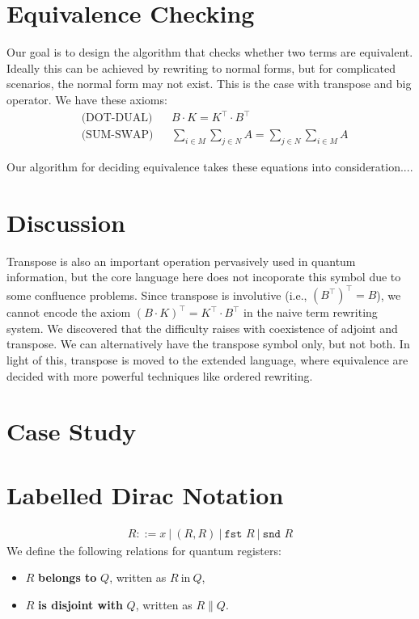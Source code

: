 \documentclass[manuscript, review, timestamp]{acmart}
\newcommand*{\fst}{\texttt{fst }}
\newcommand*{\snd}{\texttt{snd }}
\begin{document}
\section{Equivalence Checking}

Our goal is to design the algorithm that checks whether two terms are equivalent. Ideally this can be achieved by rewriting to normal forms, but for complicated scenarios, the normal form may not exist. This is the case with transpose and big operator. We have these axioms: 
\begin{align*}
& \text{(DOT-DUAL)} && B \cdot K = K^\top \cdot B^\top \\
& \text{(SUM-SWAP)} && \sum_{i \in M} \sum_{j \in N} A = \sum_{j \in N} \sum_{i \in M} A 
\end{align*}

Our algorithm for deciding equivalence takes these equations into consideration....


\section{Discussion}

Transpose is also an important operation pervasively used in quantum information, but the core language here does not incoporate this symbol due to some confluence problems. Since transpose is involutive (i.e., $(B^\top)^\top = B$), we cannot encode the axiom $ (B \cdot K)^\top = K^\top \cdot B^\top$ in the naive term rewriting system. We discovered that the difficulty raises with coexistence of adjoint and transpose. We can alternatively have the transpose symbol only, but not both. In light of this, transpose is moved to the extended language, where equivalence are decided with more powerful techniques like ordered rewriting.


\section{Case Study}




\section{Labelled Dirac Notation}

\begin{definition}
  \begin{align*}
    R ::= x\ |\ (R, R)\ |\ \fst R\ |\ \snd R
  \end{align*}
  We define the following relations for quantum registers:
  \begin{itemize}
    \item $R$ \textbf{belongs to} $Q$, written as $R\ \text{in}\ Q$,
    \item $R$ \textbf{is disjoint with} $Q$, written as $R \| Q$.
  \end{itemize}
\end{definition}
\end{document}
